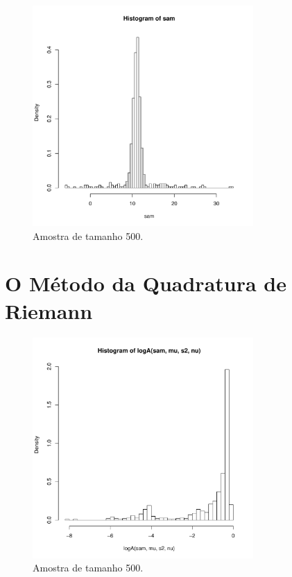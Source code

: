 \documentclass[12pt,reqno,a4paper,oneside, titlepage]{article}
\begin{document}
\begin{figure}[!htb]
	\centering
	\includegraphics[width=0.75\textwidth]{figuras/parte1/amostra_n.pdf}
	\caption{Amostra de tamanho 500.}
	\label{fig:sample}
\end{figure}



\section{O Método da Quadratura de Riemann}\label{quadratura}

\begin{figure}[!htb]
	\centering
	\includegraphics[width=0.75\textwidth]{figuras/parte1/logA.pdf}
	\caption{Amostra de tamanho 500.}
	\label{fig:logA}
\end{figure}
\end{document}
